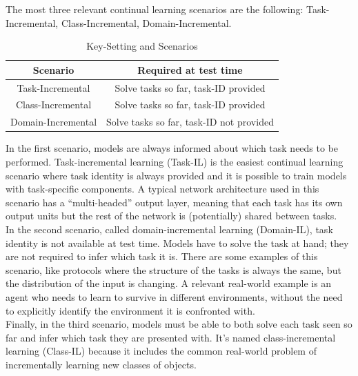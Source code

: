 \documentclass[english, LaM, oneside]{sapthesis}%
\begin{document}
The most three relevant continual learning scenarios are the following: Task-Incremental, Class-Incremental, Domain-Incremental.
\begin{table}[h]
            \centering
            \begin{tabular}{ c|c  }
                \hline
                \textbf{Scenario} & \textbf{Required at test time}\\
                \hline \hline
                Task-Incremental & Solve tasks so far, task-ID provided\\
                \hline
                Class-Incremental & Solve tasks so far, task-ID provided\\
                \hline 
                Domain-Incremental & Solve tasks so far, task-ID not provided\\
               
                
                
                \hline 
                
            \end{tabular}
            
            \caption{Key-Setting and Scenarios}
            \label{tab:vggrob}
        \end{table}
In the first scenario, models are always informed about which task needs to be performed. Task-incremental learning (Task-IL) is the easiest continual learning scenario where task identity is always provided and it is possible to train models with task-specific components. A typical network architecture used in this scenario has a “multi-headed” output layer, meaning that each task has its own output units but the rest of the network is (potentially) shared between tasks.
\\
In the second scenario, called domain-incremental learning (Domain-IL), task identity is not available at test time. Models have to solve the task at hand; they are not required to infer which task it is. There are some examples of this scenario, like protocols where the structure of the tasks is always the same, but the distribution of the input is changing. A relevant real-world example is an agent who needs to learn to survive in different environments, without the need to explicitly identify the environment it is confronted with.
\\
Finally, in the third scenario, models must be able to both solve each task seen so far and infer which task they are presented with. It's named class-incremental learning (Class-IL) because it includes the common real-world problem of incrementally learning new classes of objects.
\end{document}
